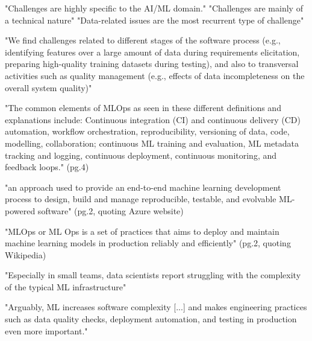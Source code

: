 "Challenges are highly specific to the AI/ML domain."
"Challenges are mainly of a technical nature"
"Data-related issues are the most recurrent type of challenge"

"We find challenges related to different stages of the software process
(e.g., identifying features over a large amount of data during requirements
elicitation, preparing high-quality training datasets during testing), and also
to transversal activities such as quality management (e.g., effects of data
incompleteness on the overall system quality)"


\parencite{Mboweni2022ADevOps}

"The common elements of MLOps as seen in these different definitions and
explanations include: Continuous integration (CI) and continuous delivery (CD)
automation, workflow orchestration, reproducibility, versioning of data, code,
modelling, collaboration; continuous ML training and evaluation, ML metadata
tracking and logging, continuous deployment, continuous monitoring, and
feedback loops." (pg.4)

"an approach used to provide an end-to-end machine learning development process
to design, build and manage reproducible, testable, and evolvable ML-powered
software" (pg.2, quoting Azure website)

"MLOps or ML Ops is a set of practices that aims to deploy and maintain
machine learning models in production reliably and efficiently"
(pg.2, quoting Wikipedia)


\parencite{Nahar2021MoreProjects}

"Especially in small teams, data scientists report struggling with the
complexity of the typical ML infrastructure"

"Arguably, ML increases software complexity [...] and makes engineering
practices such as data quality checks, deployment automation, and testing
in production even more important."


\parencite{Nahar2023APractitioners}

